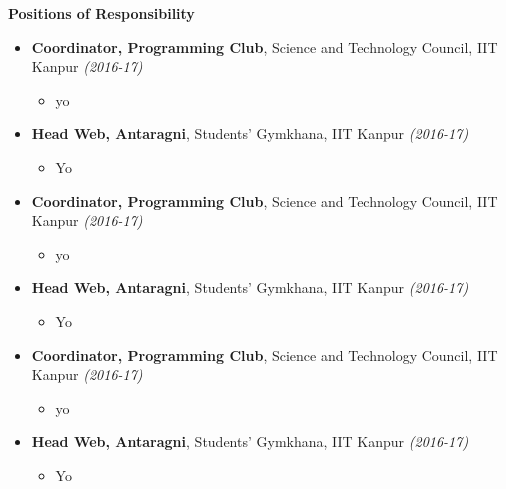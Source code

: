 \documentclass[letterpaper,11pt]{article}
\begin{document}
{\Large{\textbf{Positions of Responsibility}}
\normalsize
\vspace{-6pt}
\begin{itemize}
    \item \textbf{Coordinator, Programming Club}, Science and Technology Council, IIT Kanpur \hfill \textit{(2016-17)}
        \vspace{-6pt}
        \begin{itemize}
            \item yo
        \end{itemize}
        \vspace{-8pt}
    \item \textbf{Head Web, Antaragni}, Students' Gymkhana, IIT Kanpur \hfill \textit{(2016-17)}
        \vspace{-6pt}
        \begin{itemize}
            \item Yo
        \end{itemize}
    \item \textbf{Coordinator, Programming Club}, Science and Technology Council, IIT Kanpur \hfill \textit{(2016-17)}
        \vspace{-6pt}
        \begin{itemize}
            \item yo
        \end{itemize}
        \vspace{-8pt}
    \item \textbf{Head Web, Antaragni}, Students' Gymkhana, IIT Kanpur \hfill \textit{(2016-17)}
        \vspace{-6pt}
        \begin{itemize}
            \item Yo
        \end{itemize}
    \item \textbf{Coordinator, Programming Club}, Science and Technology Council, IIT Kanpur \hfill \textit{(2016-17)}
        \vspace{-6pt}
        \begin{itemize}
            \item yo
        \end{itemize}
        \vspace{-8pt}
    \item \textbf{Head Web, Antaragni}, Students' Gymkhana, IIT Kanpur \hfill \textit{(2016-17)}
        \vspace{-6pt}
        \begin{itemize}
            \item Yo
        \end{itemize}
\end{itemize}
}
\end{document}

